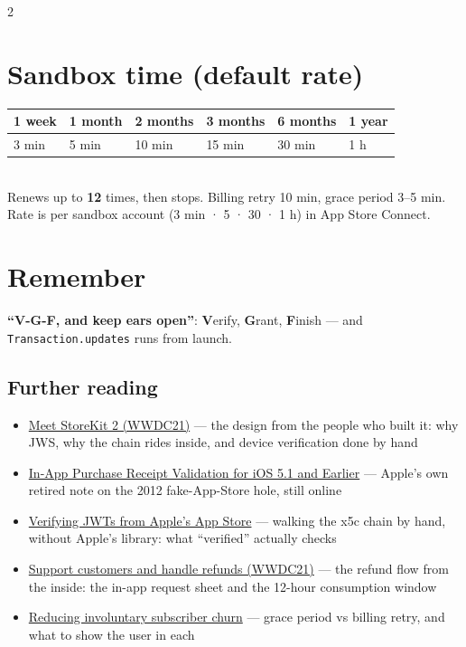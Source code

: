 \documentclass[8pt]{extarticle}
\begin{document}
\begin{multicols}{2}
\section{Sandbox time (default rate)}
{\footnotesize
\begin{tabular}{@{}l l l l l l@{}}
\toprule
1 week & 1 month & 2 months & 3 months & 6 months & 1 year \\ \midrule
3 min & 5 min & 10 min & 15 min & 30 min & 1 h \\
\bottomrule
\end{tabular}}\\
{\scriptsize Renews up to \textbf{12} times, then stops. Billing retry 10 min, grace
period 3–5 min. Rate is per sandbox account (3 min · 5 · 30 · 1 h) in App Store Connect.}

\section{Remember}
\textbf{``V-G-F, and keep ears open''}: \textbf{V}erify, \textbf{G}rant,
\textbf{F}inish — and \texttt{Transaction.updates} runs from launch.

\begin{htmlonly}
\section{Further reading}
\begin{itemize}
  \item \href{https://developer.apple.com/videos/play/wwdc2021/10114/}{Meet StoreKit 2 (WWDC21)} — the design from the people who built it: why JWS, why the chain rides inside, and device verification done by hand
  \item \href{https://developer.apple.com/library/archive/releasenotes/StoreKit/IAP_ReceiptValidation/}{In-App Purchase Receipt Validation for iOS 5.1 and Earlier} — Apple's own retired note on the 2012 fake-App-Store hole, still online
  \item \href{https://andrealeopardi.com/posts/verifying-apple-jwts/}{Verifying JWTs from Apple's App Store} — walking the x5c chain by hand, without Apple's library: what ``verified'' actually checks
  \item \href{https://developer.apple.com/videos/play/wwdc2021/10175/}{Support customers and handle refunds (WWDC21)} — the refund flow from the inside: the in-app request sheet and the 12-hour consumption window
  \item \href{https://developer.apple.com/documentation/storekit/reducing-involuntary-subscriber-churn}{Reducing involuntary subscriber churn} — grace period vs billing retry, and what to show the user in each
\end{itemize}
\end{htmlonly}

\end{multicols}

\end{document}
